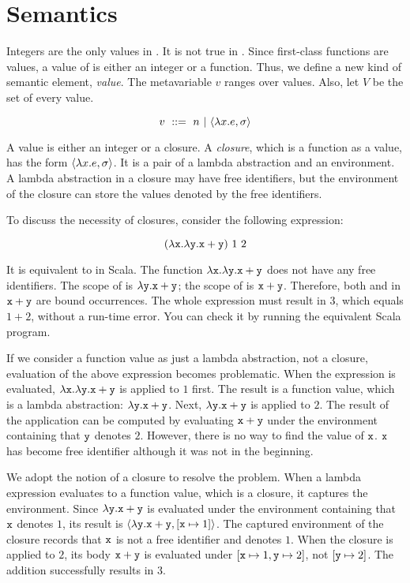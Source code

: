 \section{Semantics}

Integers are the only values in \plang. It is not true in \lang. Since
first-class functions are values, a value of \lang is either an integer or a
function. Thus, we define a new kind of semantic element, \textit{value}. The
metavariable $v$ ranges over values. Also, let $V$ be the set of every value.

\[ v\ ::=\ n\ |\ \clov{x}{e}{\sigma} \]

A value is either an integer or a closure. A \textit{closure}, which is a
function as a value, has the form $\langle\lambda x.e,\sigma\rangle$.
It is a pair of a lambda abstraction and an environment.
A lambda abstraction in a closure may have free identifiers,
but the environment of the closure can store the values denoted by the
free identifiers.

To discuss the necessity of closures, consider the following expression:

\[(\lambda\texttt{x}.\lambda\texttt{y}.\texttt{x}+\texttt{y})\ 1\ 2\]

It is equivalent to  in Scala.
The function $\lambda\texttt{x}.\lambda\texttt{y}.\texttt{x}+\texttt{y}$ does not have any free
identifiers. The scope of  is ${\lambda\texttt{y}.\texttt{x}+\texttt{y}}$; the scope
of  is ${\texttt{x}+\texttt{y}}$. Therefore, both  and  in
$\texttt{x}+\texttt{y}$ are bound occurrences. The whole expression must result in $3$,
which equals $1+2$, without a run-time error. You can check it by running the
equivalent Scala program.

If we consider a function value as just a lambda abstraction, not a closure,
evaluation of the above expression becomes problematic.
When the expression is evaluated, $\lambda\texttt{x}.\lambda\texttt{y}.\texttt{x}+\texttt{y}$ is
applied to $1$ first. The result is a function value, which is a lambda
abstraction: $\lambda\texttt{y}.\texttt{x}+\texttt{y}$. Next, $\lambda\texttt{y}.\texttt{x}+\texttt{y}$
is applied to $2$. The result of the application can be computed by evaluating
$\texttt{x}+\texttt{y}$ under the environment containing that $\texttt{y}$ denotes $2$.
However, there is no way to find the value of $\texttt{x}$. $\texttt{x}$ has become free
identifier although it was not in the beginning.

We adopt the notion of a closure to resolve the problem. When a lambda
expression evaluates to a function value, which is a closure, it captures the
environment. Since $\lambda\texttt{y}.\texttt{x}+\texttt{y}$ is evaluated under the
environment containing that $\texttt{x}$ denotes $1$, its result is
$\langle\lambda\texttt{y}.\texttt{x}+\texttt{y},[\texttt{x}\mapsto1]\rangle$. The captured environment of the
closure records that $\texttt{x}$ is not a free identifier and denotes $1$.
When the closure is applied to $2$, its body ${\texttt{x}+\texttt{y}}$ is evaluated
under $[\texttt{x}\mapsto1,\texttt{y}\mapsto2]$, not $[\texttt{y}\mapsto2]$. The addition
successfully results in $3$.

